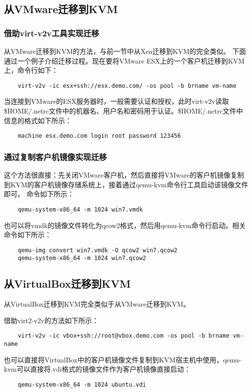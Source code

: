 \documentclass[a4paper,left=2.5cm,right=2.5cm,11pt]{article}
\begin{document}
\subsection{从VMware迁移到KVM}
\subsubsection{借助virt-v2v工具实现迁移}
	从VMware迁移到KVM的方法，与前一节中从Xen迁移到KVM的完全类似。
	下面通过一个例子介绍迁移过程。现在要将VMware ESX上的一个客户机迁移到KVM上，命令行如下：
	\begin{lstlisting}
	virt-v2v -ic esx+ssh://esx.demo.com/ -os pool -b brname vm-name
	\end{lstlisting}

	当连接到VMware的ESX服务器时，一般需要认证和授权，此时virt-v2v读取\$HOME/.netrc文件中的机器名、用户名和密码用于认证。\$HOME/.netrc文件中信息的格式如下所示：
	\begin{lstlisting}
	machine esx.demo.com login root password 123456
	\end{lstlisting}

\subsubsection{通过复制客户机镜像实现迁移}
	这个方法很直接：先关闭VMware客户机，然后直接将VMware的客户机镜像复制到KVM的客户机镜像存储系统上，接着通过qemu-kvm命令行工具启动该镜像文件即可。
	命令如下所示：
	\begin{lstlisting}
	qemu-system-x86_64 -m 1024 win7.vmdk
	\end{lstlisting}

	也可以将vmdk的镜像文件转化为qcow2格式，然后用qemu-kvm命令行启动。相关命令如下所示：
	\begin{lstlisting}
	qemu-img convert win7.vmdk -O qcow2 win7.qcow2
	qemu-system-x86_64 -m 1024 win7.qcow2
	\end{lstlisting}

\subsection{从VirtualBox迁移到KVM}
	从VirtualBox迁移到KVM完全类似于从VMware迁移到KVM。\par
	借助virt2-v2v的方法如下所示：
	\begin{lstlisting}
	virt-v2v -ic vbox+ssh://root@vbox.demo.com -os pool -b brname vm-name
	\end{lstlisting}

	也可以直接将VirtualBox中的客户机镜像文件复制到KVM宿主机中使用，qemu-kvm可以直接将.vdi格式的镜像文件作为客户机镜像直接启动：
	\begin{lstlisting}
	qemu-system-x86_64 -m 1024 ubuntu.vdi
	\end{lstlisting}
\end{document}
